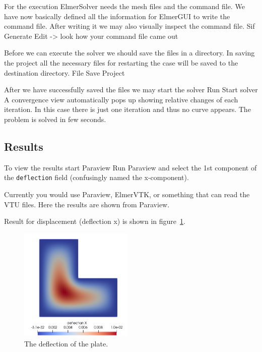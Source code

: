 For the execution ElmerSolver needs the mesh files and the command file. 
We have now basically defined all the information for ElmerGUI to write 
the command file. After writing it we may also visually inspect the command file.
\ttbegin
Sif 
  Generate
  Edit -> look how your command file came out  
\ttend

Before we can execute the solver we should save the files in a directory. In saving the project all the
necessary files for restarting the case will be saved to the destination directory.
\ttbegin
File 
  Save Project
\ttend

After we have successfully saved the files we may start the solver
\ttbegin
Run
  Start solver
\ttend
A convergence view automatically pops up showing relative changes 
of each iteration.  In this case there is just one iteration and thus 
no curve appears.  The problem is solved in few seconds.

\subsection*{Results}
To view the results start Paraview
\ttbegin
Run
  Paraview
\ttend
and select the 1st component of the \texttt{deflection} field (confusingly 
named the x-component). 

 Currently you would use Paraview, ElmerVTK, or something that can read the
VTU files. Here the results are shown from Paraview.

Result for displacement (deflection x) is shown in figure~\ref{fig:simplePlateDeflection}.
%
\begin{figure}[tbhp]
\begin{center}
\includegraphics[width=0.48\textwidth]{simplePlateDeflection}
\end{center}
\caption{The deflection of the plate.}
\label{fig:simplePlateDeflection}
\end{figure}

